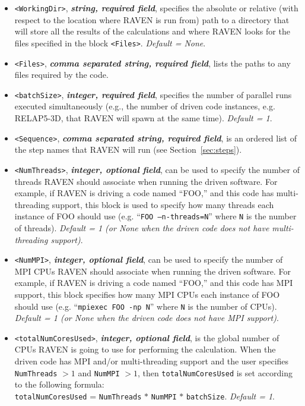 \begin{itemize}
\item \texttt{<WorkingDir>}, \textbf{\textit{string, required field}}, specifies
the absolute or relative (with respect to the location where RAVEN is run from)
path to a directory that will store all the results of the calculations and
where RAVEN looks for the files specified in the block \texttt{<Files>}.
%
\textit{Default = None}.

\item \texttt{<Files>}, \textbf{\textit{comma separated string, required
field}}, lists the paths to any files required by the code.

\item \texttt{<batchSize>}, \textbf{\textit{integer, required field}}, specifies
the number of parallel runs executed simultaneously (e.g., the number of driven
code instances, e.g. RELAP5-3D, that RAVEN will spawn at the same time).
%
\textit{Default = 1}.

\item \texttt{<Sequence>}, \textbf{\textit{comma separated string, required
field}}, is an ordered list of the step names that RAVEN will run (see
Section~\ref{sec:steps}).

\item \texttt{<NumThreads>}, \textbf{\textit{integer, optional field}}, can be
used to specify the number of threads RAVEN should associate when running the
driven software.
%
For example, if RAVEN is driving a code named ``FOO,'' and this code has
multi-threading support, this block is used to specify how many threads each
instance of FOO should use (e.g. ``\texttt{FOO --n-threads=N}'' where \texttt{N}
 is the number of threads).
%
\textit{Default = 1 (or None when the driven code does not have multi-threading
support)}.

\item \texttt{<NumMPI>}, \textbf{\textit{integer, optional field}}, can be used
to specify the number of MPI CPUs RAVEN should associate when running the driven
software.
%
For example, if RAVEN is driving a code named ``FOO,'' and this code has MPI
support, this block specifies how many MPI CPUs each instance of FOO should use
(e.g. ``\texttt{mpiexec FOO -np N}'' where \texttt{N} is the number of CPUs).
%
\textit{Default = 1 (or None when the driven code does not have MPI support)}.

\item \texttt{<totalNumCoresUsed>}, \textbf{\textit{integer, optional field}},
is the global number of CPUs RAVEN is going to use for performing the
calculation.
%
When the driven code has MPI and/or multi-threading support and the user
specifies \texttt{NumThreads} $> 1$  and \texttt{NumMPI} $> 1$, then
\texttt{totalNumCoresUsed} is set according to the following formula:\\
\texttt{totalNumCoresUsed} = \texttt{NumThreads} $*$ \texttt{NumMPI} $*$
\texttt{batchSize}.
%
\textit{Default = 1}.


\end{itemize}
